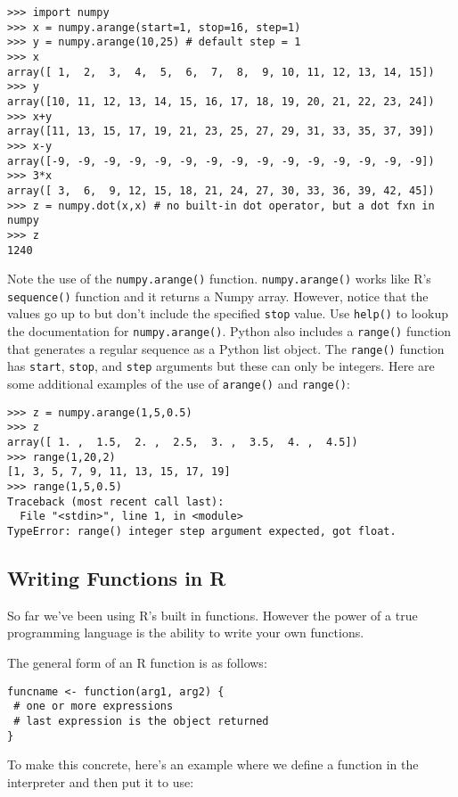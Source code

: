 \begin{lstlisting}
>>> import numpy
>>> x = numpy.arange(start=1, stop=16, step=1)
>>> y = numpy.arange(10,25) # default step = 1
>>> x
array([ 1,  2,  3,  4,  5,  6,  7,  8,  9, 10, 11, 12, 13, 14, 15])
>>> y
array([10, 11, 12, 13, 14, 15, 16, 17, 18, 19, 20, 21, 22, 23, 24])
>>> x+y
array([11, 13, 15, 17, 19, 21, 23, 25, 27, 29, 31, 33, 35, 37, 39])
>>> x-y
array([-9, -9, -9, -9, -9, -9, -9, -9, -9, -9, -9, -9, -9, -9, -9])
>>> 3*x
array([ 3,  6,  9, 12, 15, 18, 21, 24, 27, 30, 33, 36, 39, 42, 45])
>>> z = numpy.dot(x,x) # no built-in dot operator, but a dot fxn in numpy
>>> z
1240
\end{lstlisting}
Note the use of the \lstinline!numpy.arange()! function.
\lstinline!numpy.arange()! works like R's \lstinline!sequence()!
function and it returns a Numpy array. However, notice that the values
go up to but don't include the specified \lstinline!stop! value. Use
\lstinline!help()! to lookup the documentation for
\lstinline!numpy.arange()!. Python also includes a \lstinline!range()!
function that generates a regular sequence as a Python list object. The
\lstinline!range()! function has \lstinline!start!, \lstinline!stop!,
and \lstinline!step! arguments but these can only be integers. Here are
some additional examples of the use of \lstinline!arange()! and
\lstinline!range()!:

\begin{lstlisting}
>>> z = numpy.arange(1,5,0.5) 
>>> z
array([ 1. ,  1.5,  2. ,  2.5,  3. ,  3.5,  4. ,  4.5])
>>> range(1,20,2)
[1, 3, 5, 7, 9, 11, 13, 15, 17, 19]
>>> range(1,5,0.5)
Traceback (most recent call last):
  File "<stdin>", line 1, in <module>
TypeError: range() integer step argument expected, got float.
\end{lstlisting}
\subsection{Writing Functions in R}

So far we've been using R's built in functions. However the power of a
true programming language is the ability to write your own functions.

The general form of an R function is as follows:

\begin{lstlisting}
funcname <- function(arg1, arg2) {
 # one or more expressions
 # last expression is the object returned
}
\end{lstlisting}
To make this concrete, here's an example where we define a function in
the interpreter and then put it to use:

